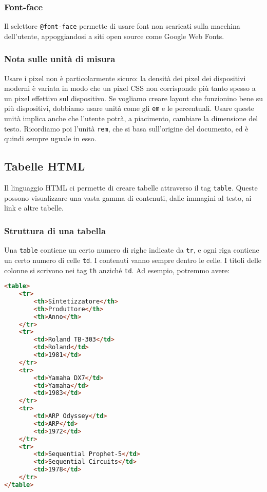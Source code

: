 \documentclass[a4paper,11pt]{article}
\begin{document}
\subsubsection{Font-face}
Il selettore \lstinline|@font-face| permette di usare font non scaricati sulla macchina dell'utente, appoggiandosi a siti open source come Google Web Fonts.

\subsubsection{Nota sulle unità di misura}
Usare i pixel non è particolarmente sicuro: la densità dei pixel dei dispositivi moderni è variata in modo che un pixel CSS non corrisponde più tanto spesso a un pixel effettivo sul dispositivo.
Se vogliamo creare layout che funzionino bene su più dispositivi, dobbiamo usare unità come gli \lstinline|em| e le percentuali.
Usare queste unità implica anche che l'utente potrà, a piacimento, cambiare la dimensione del testo.
Ricordiamo poi l'unità \lstinline|rem|, che si basa sull'origine del documento, ed è quindi sempre uguale in esso.

\lstset{language=html, style=codestyle}

\subsection{Tabelle HTML}
Il linguaggio HTML ci permette di creare tabelle attraverso il tag \lstinline|table|.
Queste possono visualizzare una vasta gamma di contenuti, dalle immagini al testo, ai link e altre tabelle.

\subsubsection{Struttura di una tabella}
Una \lstinline|table| contiene un certo numero di righe indicate da \lstinline|tr|, e ogni riga contiene un certo numero di celle \lstinline|td|. I contenuti vanno sempre dentro le celle.
I titoli delle colonne si scrivono nei tag \lstinline|th| anziché \lstinline|td|.
Ad esempio, potremmo avere:

\begin{lstlisting}[language=html, style=codestyle]	
<table>
	<tr>
		<th>Sintetizzatore</th>
		<th>Produttore</th>
		<th>Anno</th>
	</tr>
	<tr>
		<td>Roland TB-303</td>
		<td>Roland</td>
		<td>1981</td>
	</tr>
	<tr>
		<td>Yamaha DX7</td>
		<td>Yamaha</td>
		<td>1983</td>
	</tr>
	<tr>
		<td>ARP Odyssey</td>
		<td>ARP</td>
		<td>1972</td>
	</tr>
	<tr>
		<td>Sequential Prophet-5</td>
		<td>Sequential Circuits</td>
		<td>1978</td>
	</tr>
</table>
\end{lstlisting}
\end{document}

